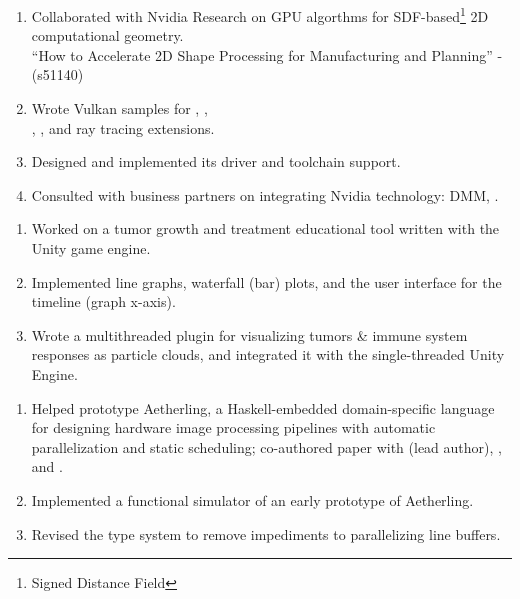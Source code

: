 \begin{enumerate}
\item Collaborated with Nvidia Research on GPU algorthms for
  SDF-based\footnote{Signed Distance Field} 2D computational
  geometry.\\ ``How to Accelerate 2D Shape Processing for
  Manufacturing and Planning'' -
   (s51140)

\item Wrote Vulkan samples for
  ,
  ,\\
  ,
  , and ray tracing extensions.

\item
  Designed
  \texttt{}
  and implemented its driver and toolchain support.

\item Consulted with business partners on integrating Nvidia
  technology: DMM, .
\end{enumerate}
\filbreak
{}
\begin{enumerate}
\item Worked on a tumor growth and treatment educational tool written with
  the Unity game engine.
\item Implemented line graphs, waterfall (bar) plots, and the user interface
  for the timeline (graph x-axis).
\item Wrote a multithreaded  plugin for visualizing
  tumors \& immune system responses as particle clouds, and integrated
  it with the single-threaded  Unity Engine.
\end{enumerate}
\filbreak
{}
\begin{enumerate}
\item Helped prototype Aetherling, a Haskell-embedded domain-specific
  language for designing hardware image processing pipelines with
  automatic parallelization and static scheduling;
  co-authored paper with
   (lead author),
  ,
  and .
\item Implemented a functional simulator of an early prototype of
  Aetherling.
\item Revised the type system to remove impediments to parallelizing
  line buffers.
\end{enumerate}
